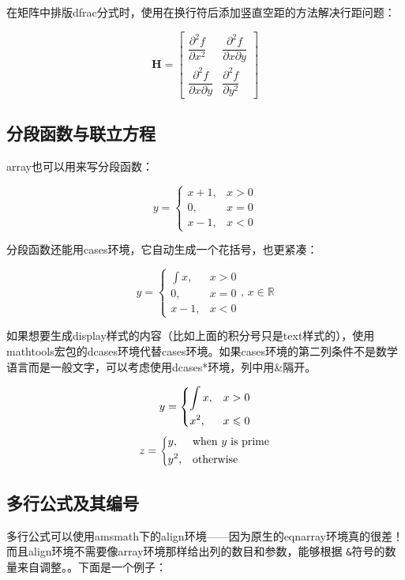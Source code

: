{在矩阵中排版dfrac分式时，使用在换行符后添加竖直空距的方法解决行距问题：

\begin{codeshow}
\[\mathbf{H}=
\begin{bmatrix}
\dfrac{\partial^2 f}{\partial x^2} &
\dfrac{\partial^2 f}
{\partial x \partial y} \\[8pt]
\dfrac{\partial^2 f}
{\partial x \partial y} &
\dfrac{\partial^2 f}{\partial y^2}
\end{bmatrix}\]
\end{codeshow}


\subsection{分段函数与联立方程}
array也可以用来写分段函数：

\begin{codeshow}
\[y=\left\{\begin{array}{ll}
x+1, & x>0 \\
0,   & x=0 \\
x-1, & x<0
\end{array}\right.\]
\end{codeshow}

分段函数还能用cases环境，它自动生成一个花括号，也更紧凑：

\begin{codeshow}
\[y=\begin{cases}
\int x, & x>0 \\
0,   & x=0 \\
x-1, & x<0
\end{cases},\,
x\in\mathbb{R}\]
\end{codeshow}

如果想要生成display样式的内容（比如上面的积分号只是text样式的），使用mathtools宏包的dcases环境代替cases环境。如果cases环境的第二列条件不是数学语言而是一般文字，可以考虑使用dcases*环境，列中用\&{}隔开。

\begin{codeshow}
\[y=\begin{dcases}
  \int x, & x>0 \\
  x^2, & x\leqslant 0
  \end{dcases}\]
\[z=\begin{dcases*}
  y, & when $y$ is prime\\
  y^2, & otherwise
  \end{dcases*}\]
\end{codeshow}

\subsection{多行公式及其编号}
\label{subsec:multieqnum}
多行公式可以使用amsmath下的align环境——因为原生的eqnarray环境真的很差！而且align环境不需要像array环境那样给出列的数目和参数，能够根据
\texttt{\&}符号的数量来自调整。。下面是一个例子：

}
